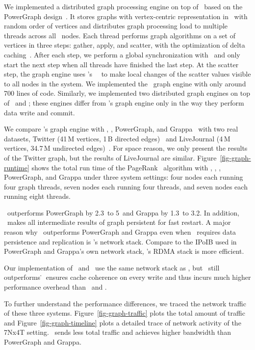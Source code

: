 We implemented a distributed graph processing engine on top of \hotpot\ based on the PowerGraph design~\cite{Gonzalez12-OSDI}.
It stores graphs with vertex-centric representation in \dsnvm\ with random order of vertices
and distributes graph processing load to multiple threads across all \hotpot\ nodes.
Each thread performs graph algorithms on a set of vertices in three steps: gather, apply, and scatter, 
with the optimization of delta caching~\cite{Gonzalez12-OSDI}.
After each step, we perform a global synchronization with \barrier\ and only start the next step when all threads have finished the last step.
At the scatter step, the graph engine uses \hotpot's \mrsw\ \commitxact\ to make local changes of the scatter values 
visible to all nodes in the system. We implemented the \hotpot\ graph engine with only around 700 lines of code.
Similarly, we implemented two distributed graph engines on top of \dsmxact\ and \dsmnoxact;
these engines differ from \hotpot's graph engine only in the way they perform data write and commit.

We compare \hotpot's graph engine with \dsmxact, \dsmnoxact, PowerGraph, and Grappa~\cite{Nelson15-ATC} with two real datasets,
Twitter (41\,M vertices, 1\,B directed edges)~\cite{Kwak10-WWW} and LiveJournal (4\,M vertices, 34.7\,M undirected edges)~\cite{snapnets}.
For space reason, we only present the results of the Twitter graph, but the results of LiveJournal are similar.
Figure~\ref{fig-graph-runtime} shows the total run time of the PageRank~\cite{PageRank} algorithm with
\hotpot, \dsmxact, \dsmnoxact, PowerGraph, and Grappa under three system settings:
four nodes each running four graph threads, seven nodes each running four threads, and seven nodes each running eight threads.

\hotpot\ outperforms PowerGraph by 2.3\x\ to 5\x\ and Grappa by 1.3\x\ to 3.2\x.
In addition, \hotpot\ makes all intermediate results of graph persistent for fast restart. 
A major reason why \hotpot\ outperforms PowerGraph and Grappa even when \hotpot\
requires data persistence and replication is \hotpot's network stack.
Compare to the IPoIB used in PowerGraph and Grappa's own network stack,
\hotpot's RDMA stack is more efficient.

Our implementation of \dsmxact\ and \dsmnoxact\ use the same network stack as \hotpot,
but \hotpot\ still outperforms \dsmnoxact\.
\dsmnoxact\ ensures cache coherence on every write and thus incurs much higher performance overhead than \hotpot\ and \dsmxact.

To further understand the performance differences, we traced the network traffic of these three systems.
Figure~\ref{fig-graph-traffic} plots the total amount of traffic %
and Figure~\ref{fig-graph-timeline} plots a detailed trace of network activity of the 7Nx4T setting.
\hotpot\ sends less total traffic and achieves higher bandwidth than PowerGraph and Grappa.
